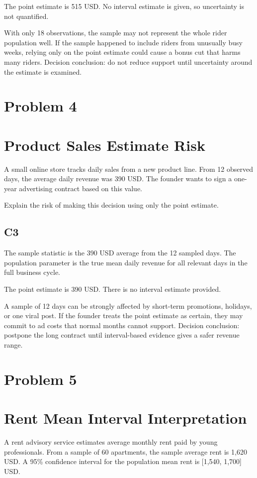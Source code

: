 \begin{ExamProblems}
		The point estimate is 515 USD.
		No interval estimate is given, so uncertainty is not quantified.

		With only 18 observations, the sample may not represent the whole rider population well.
		If the sample happened to include riders from unusually busy weeks, relying only on the point estimate could cause a bonus cut that harms many riders.
		Decision conclusion: do not reduce support until uncertainty around the estimate is examined.

		\newpage
		\item
		\section{Problem 4}
		\section{Product Sales Estimate Risk}
		A small online store tracks daily sales from a new product line.
		From 12 observed days, the average daily revenue was 390 USD.
		The founder wants to sign a one-year advertising contract based on this value.

		Explain the risk of making this decision using only the point estimate.

		\subsection*{C3}
		The sample statistic is the 390 USD average from the 12 sampled days.
		The population parameter is the true mean daily revenue for all relevant days in the full business cycle.

		The point estimate is 390 USD.
		There is no interval estimate provided.

		A sample of 12 days can be strongly affected by short-term promotions, holidays, or one viral post.
		If the founder treats the point estimate as certain, they may commit to ad costs that normal months cannot support.
		Decision conclusion: postpone the long contract until interval-based evidence gives a safer revenue range.

		\newpage
		\item
		\section{Problem 5}
		\section{Rent Mean Interval Interpretation}
		A rent advisory service estimates average monthly rent paid by young professionals.
		From a sample of 60 apartments, the sample average rent is 1,620 USD.
		A 95\% confidence interval for the population mean rent is [1,540, 1,700] USD.


\end{ExamProblems}
